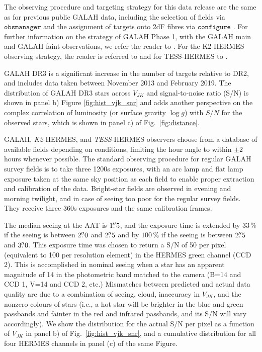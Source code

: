 \documentclass[fleqn,usenatbib,useAMS]{mnras}
\newcommand{\tess}{\textit{TESS}\xspace}
\newcommand{\Ktwo}{\textit{K2}\xspace}
\begin{document}
The observing procedure and targeting strategy for this data release are the same as for previous public GALAH data, including the selection of fields via $\texttt{obsmanager}$ and the assignment of targets onto 2dF fibres via $\texttt{configure}$ \citep{Miszalski2006}. For further information on the strategy of GALAH Phase 1, with the GALAH main and GALAH faint observations, we refer the reader to \citet{Buder2018}. For the K2-HERMES observing strategy, the reader is referred to \citet{Wittenmyer2018, Sharma2019} and for TESS-HERMES to \citet{Sharma2018}.

GALAH DR3 is a significant increase in the number of targets relative to DR2, and includes data taken between November 2013 and February 2019. The distribution of GALAH DR3 stars across $V_{JK}$ and signal-to-noise ratio (S/N) is shown in panel b) Figure \ref{fig:hist_vjk_snr} and adds another perspective on the complex correlation of luminosity (or surface gravity $\log g$) with $S/N$ for the observed stars, which is shown in panel c) of Fig.~\ref{fig:distance}.

GALAH, \Ktwo-HERMES, and \tess-HERMES observers choose from a database of available fields depending on conditions, limiting the hour angle to within $\pm 2$ hours whenever possible. The standard observing procedure for regular GALAH survey fields is to take three 1200s exposures, with an arc lamp and flat lamp exposure taken at the same sky position as each field to enable proper extraction and calibration of the data. Bright-star fields are observed in evening and morning twilight, and in case of seeing too poor for the regular survey fields. They receive three 360s exposures and the same calibration frames.

The median seeing at the AAT is $1\hbox{$.\!\!^{\prime\prime}$} 5$, and the exposure time is extended by $33\,\%$ if the seeing is between $2\hbox{$.\!\!^{\prime\prime}$} 0$ and $2\hbox{$.\!\!^{\prime\prime}$} 5$ and by $100\,\%$ if the seeing is between $2\hbox{$.\!\!^{\prime\prime}$} 5$ and $3\hbox{$.\!\!^{\prime\prime}$} 0$. This exposure time was chosen to return a S/N of 50 per pixel (equivalent to 100 per resolution element) in the HERMES green channel (CCD 2).  This is accomplished in nominal seeing when a star has an apparent magnitude of 14 in the photometric band matched to the camera (B=14 and CCD 1, V=14 and CCD 2, etc.) Mismatches between predicted and actual data quality are due to a combination of seeing, cloud, inaccuracy in $V_{JK}$, and the nonzero colours of stars (i.e., a hot star will be brighter in the blue and green passbands and fainter in the red and infrared passbands, and its S/N will vary accordingly). We show the distribution for the actual S/N per pixel as a function of $V_{JK}$ in panel b) of Fig.~\ref{fig:hist_vjk_snr}, and a cumulative distribution for all four HERMES channels in panel (c) of the same Figure. 
\end{document}
